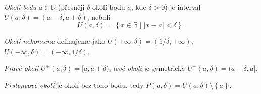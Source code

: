 \begin{definition}[Okolí]
	\emph{Okolí bodu} $a \in \mathbb{R}$ (přesněji $\delta$-okolí bodu $a$, kde $\delta > 0$) je interval $U(a, \delta) = (a - \delta, a + \delta)$, neboli
	$$U(a, \delta) = \left\{ x \in \mathbb{R} \mid |x - a| < \delta \right\}.$$

	\emph{Okolí nekonečna} definujeme jako $U(+\infty, \delta) = (1/\delta, +\infty)$, $U(-\infty, \delta) = (-\infty, 1/\delta)$.

	\emph{Pravé okolí} $U^+(a, \delta) = [a, a + \delta)$, \emph{levé okolí} je symetricky $U^-(a, \delta) = (a-\delta, a]$.

	\emph{Prstencové okolí} je okolí bez toho bodu, tedy $P(a, \delta) = U(a, \delta) \setminus \left\{ a \right\}$.
	\label{def:okoli}
\end{definition}

